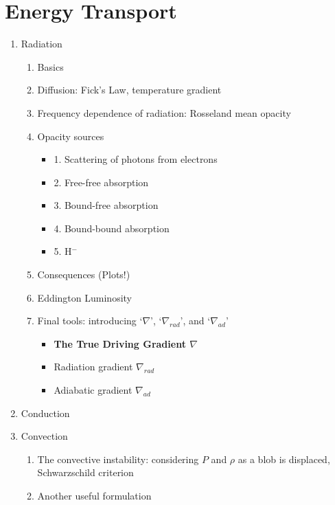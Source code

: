 \documentclass{article}
\begin{document}
\section{Energy Transport}
\begin{enumerate}
    \item Radiation
        \begin{enumerate}
            \item Basics
            \item Diffusion: Fick's Law, temperature gradient
            \item Frequency dependence of radiation:
                Rosseland mean opacity
            \item Opacity sources
                \begin{itemize}
                   \item 1. Scattering of photons from electrons
                   \item 2. Free-free absorption
                   \item 3. Bound-free absorption
                   \item 4. Bound-bound absorption
                   \item 5. H$^-$
                \end{itemize}
            \item Consequences (Plots!)
            \item Eddington Luminosity
            \item Final tools: introducing `$\nabla$', `$\nabla_{rad}$',
                and `$\nabla_{ad}$'
                \begin{itemize}
                  \item \textbf{The True Driving Gradient $\nabla$}
                  \item Radiation gradient $\nabla_{rad}$
                  \item Adiabatic gradient $\nabla_{ad}$
                \end{itemize}
        \end{enumerate}
    \item Conduction
    \item Convection
        \begin{enumerate}
            \item The convective instability: considering $P$ and $\rho$
                as a blob is displaced, Schwarzschild criterion
            \item Another useful formulation

\end{enumerate}
\end{enumerate}
\end{document}
